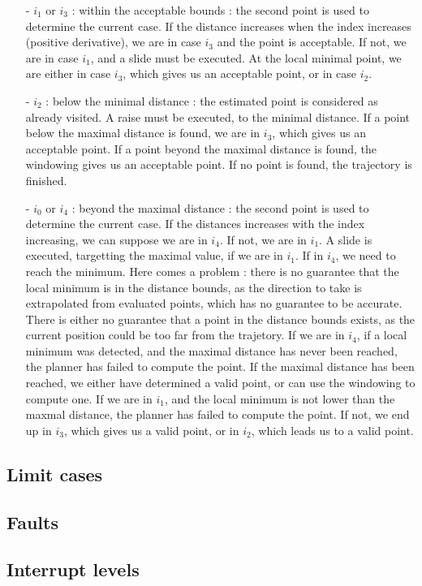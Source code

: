 \begin{itemize}

\item[-] $i_1$ or $i_3$ : within the acceptable bounds : 
the second point is used to determine the current case.
If the distance increases when the index increases (positive derivative), we are in case 
$i_3$ and the point is acceptable. 
If not, we are in case $i_1$, and a slide must be executed.
At the local minimal point, we are either in case $i_3$, which gives us an acceptable point, or in case $i_2$.

\item[-] $i_2$ : below the minimal distance : the estimated point is considered as already visited. 
A raise must be executed, to the minimal distance.
If a point below the maximal distance is found, we are in $i_3$, which gives us an acceptable point.
If a point beyond the maximal distance is found, the windowing gives us an acceptable point.
If no point is found, the trajectory is finished.

\item[-] $i_0$ or $i_4$ : beyond the maximal distance :
the second point is used to determine the current case.  
If the distances increases with the index increasing, we can suppose we are in $i_4$. If not, we are in $i_1$.
A slide is executed, targetting the maximal value, if we are in $i_1$. If in $i_4$, we need to 
reach the minimum.
Here comes a problem : there is no guarantee that the local minimum is in the distance bounds, as the
direction to take is extrapolated from evaluated points, which has no guarantee to be accurate. 
There is either no guarantee that a point in the distance bounds exists, as the current position could be too
far from the trajetory.
If we are in $i_4$, if a local minimum was detected, and the maximal distance has never been reached, 
the planner has failed to compute the point. If the maximal distance has been reached, we either 
have determined a valid point, or can use the windowing to compute one.
If we are in $i_1$, and the local minimum is not lower than the maxmal distance, the planner has failed to 
compute the point. If not, we end up in $i_3$, which gives us a valid point, or in $i_2$, which leads us to 
a valid point.

\end{itemize}

\newpage

\subsection{Limit cases}




\subsection{Faults}

\subsection{Interrupt levels}


